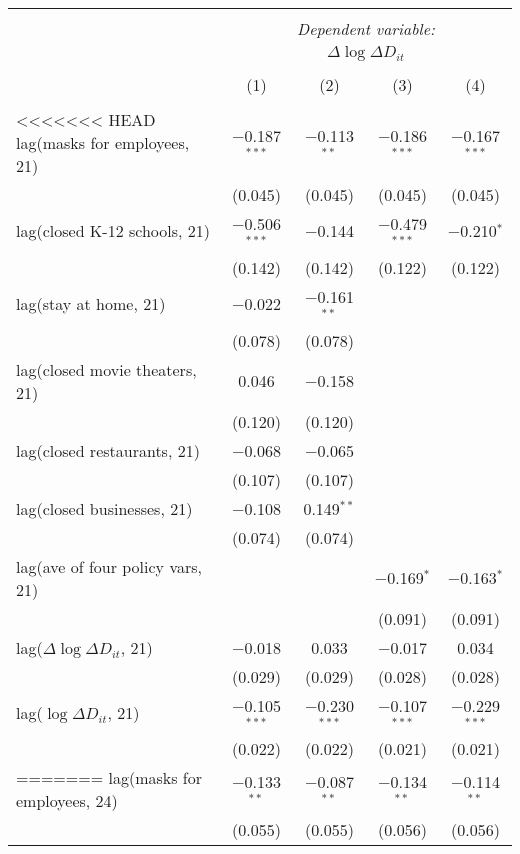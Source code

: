 \begin{tabular}{@{\extracolsep{1pt}}lcccc} 
\\[-1.8ex]\hline 
\hline \\[-1.8ex] 
 & \multicolumn{4}{c}{\textit{Dependent variable:}} \\ 
\cline{2-5} 
 & \multicolumn{4}{c}{$\Delta \log \Delta D_{it}$} \\ 
\\[-1.8ex] & (1) & (2) & (3) & (4)\\ 
\hline \\[-1.8ex] 
<<<<<<< HEAD
 lag(masks for employees, 21) & $-$0.187$^{***}$ & $-$0.113$^{**}$ & $-$0.186$^{***}$ & $-$0.167$^{***}$ \\ 
  & (0.045) & (0.045) & (0.045) & (0.045) \\ 
  lag(closed K-12 schools, 21) & $-$0.506$^{***}$ & $-$0.144 & $-$0.479$^{***}$ & $-$0.210$^{*}$ \\ 
  & (0.142) & (0.142) & (0.122) & (0.122) \\ 
  lag(stay at home, 21) & $-$0.022 & $-$0.161$^{**}$ &  &  \\ 
  & (0.078) & (0.078) &  &  \\ 
  lag(closed movie theaters, 21) & 0.046 & $-$0.158 &  &  \\ 
  & (0.120) & (0.120) &  &  \\ 
  lag(closed restaurants, 21) & $-$0.068 & $-$0.065 &  &  \\ 
  & (0.107) & (0.107) &  &  \\ 
  lag(closed businesses, 21) & $-$0.108 & 0.149$^{**}$ &  &  \\ 
  & (0.074) & (0.074) &  &  \\ 
  lag(ave of four policy vars, 21) &  &  & $-$0.169$^{*}$ & $-$0.163$^{*}$ \\ 
  &  &  & (0.091) & (0.091) \\ 
  lag($\Delta \log \Delta D_{it}$, 21) & $-$0.018 & 0.033 & $-$0.017 & 0.034 \\ 
  & (0.029) & (0.029) & (0.028) & (0.028) \\ 
  lag($\log \Delta D_{it}$, 21) & $-$0.105$^{***}$ & $-$0.230$^{***}$ & $-$0.107$^{***}$ & $-$0.229$^{***}$ \\ 
  & (0.022) & (0.022) & (0.021) & (0.021) \\ 
=======
 lag(masks for employees, 24) & $-$0.133$^{**}$ & $-$0.087$^{**}$ & $-$0.134$^{**}$ & $-$0.114$^{**}$ \\ 
  & (0.055) & (0.055) & (0.056) & (0.056) \\ 

\end{tabular}

